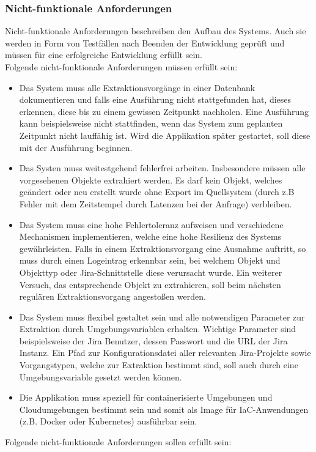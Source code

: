 \subsubsection{Nicht-funktionale Anforderungen}
Nicht-funktionale Anforderungen beschreiben den Aufbau des Systems. Auch sie werden in Form von Testfällen nach Beenden der Entwicklung geprüft und müssen für eine erfolgreiche Entwicklung erfüllt sein.\\
Folgende nicht-funktionale Anforderungen müssen erfüllt sein:
\begin{itemize}
\item Das System muss alle Extraktionsvorgänge in einer Datenbank dokumentieren und falls eine Ausführung nicht stattgefunden hat, dieses erkennen, diese bis zu einem gewissen Zeitpunkt nachholen. Eine Ausführung kann beispielsweise nicht stattfinden, wenn das System zum geplanten Zeitpunkt nicht lauffähig ist. Wird die Applikation später gestartet, soll diese mit der Ausführung beginnen.
\item Das Systen muss weitestgehend fehlerfrei arbeiten. Insbesondere müssen alle vorgesehenen Objekte extrahiert werden. Es darf kein Objekt, welches geändert oder neu erstellt wurde ohne Export im Quellsystem (durch z.B Fehler mit dem Zeitstempel durch Latenzen bei der Anfrage) verbleiben.
\item Das System muss eine hohe Fehlertoleranz aufweisen und verschiedene Mechanismen implementieren, welche eine hohe Resilienz des Systems gewährleisten. Falls in einem Extraktionsvorgang eine Ausnahme auftritt, so muss durch einen Logeintrag erkennbar sein, bei welchem Objekt und Objekttyp oder Jira-Schnittstelle diese verursacht wurde. Ein weiterer Versuch, das entsprechende Objekt zu extrahieren, soll beim nächsten regulären Extraktionsvorgang angestoßen werden.
\item Das System muss flexibel gestaltet sein und alle notwendigen Parameter zur Extraktion durch Umgebungsvariablen erhalten. Wichtige Parameter sind beispielsweise der Jira Benutzer, dessen Passwort und die URL der Jira Instanz. Ein Pfad zur Konfigurationsdatei aller relevanten Jira-Projekte sowie Vorgangstypen, welche zur Extraktion bestimmt sind, soll auch durch eine Umgebungsvariable gesetzt werden können.
\item Die Applikation muss speziell für containerisierte Umgebungen und Cloudumgebungen bestimmt sein und somit als Image für IaC-Anwendungen (z.B. Docker oder Kubernetes) ausführbar sein.
\end{itemize}
Folgende nicht-funktionale Anforderungen sollen erfüllt sein:
